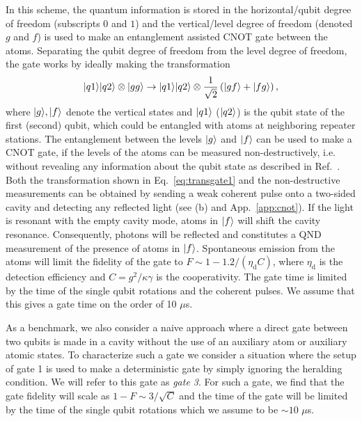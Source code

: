 In this scheme, the quantum information is stored in the horizontal/qubit degree
of freedom (subscripts $0$ and $1$) and the vertical/level degree of freedom
(denoted $g$ and $f$) is used to make an entanglement assisted CNOT gate between
the atoms. Separating the qubit degree of freedom from the level degree of
freedom, the gate works by ideally making the transformation
\begin{equation} \label{eq:transgate1}
| q1 \rangle| q2 \rangle\otimes| gg \rangle\to
| q1 \rangle| q2 \rangle\otimes\frac{1}{\sqrt{2}}\left(| gf \rangle+| fg \rangle\right),
\end{equation} 
where $| g \rangle,| f \rangle$ denote the vertical states and $| q1 \rangle$ ($| q2 \rangle$)
is the qubit state of the first (second) qubit, which could be entangled with
atoms at neighboring repeater stations. The entanglement between the levels
$| g \rangle$ and $| f \rangle$ can be used to make a CNOT gate, if the levels of the
atoms can be measured non-destructively, i.e. without revealing any information
about the qubit state as described in Ref.~\cite{Anders2prl}. Both the
transformation shown in Eq.~\eqref{eq:transgate1} and the non-destructive
measurements can be obtained by sending a weak coherent pulse onto a two-sided
cavity and detecting any reflected light (see (b) and
App.~\ref{app:cnot}). If the light is resonant with the empty cavity mode, atoms
in $| f \rangle$ will shift the cavity resonance. Consequently, photons will be
reflected and constitutes a QND measurement of the presence of atoms in
$| f \rangle$. Spontaneous emission from the atoms will limit the fidelity of the
gate to $F\sim1-1.2/(\eta_{\text{d}}C)$, where $\eta_{\text{d}}$ is the
detection efficiency and $C=g^{2}/\kappa\gamma$ is the cooperativity. The gate
time is limited by the time of the single qubit rotations and the coherent
pulses.  We assume that this gives a gate time on the order of 10 $\mu$s.

As a benchmark, we also consider a naive approach where a direct gate between
two qubits is made in a cavity without the use of an auxiliary atom or auxiliary
atomic states. To characterize such a gate we consider a situation where the
setup of gate 1 is used to make a deterministic gate by simply ignoring the
heralding condition. We will refer to this gate as \emph{gate 3}. For such a
gate, we find that the gate fidelity will scale as $1-F\sim3/\sqrt{C}$ and the
time of the gate will be limited by the time of the single qubit rotations which
we assume to be $\sim10$ $\mu$s.

